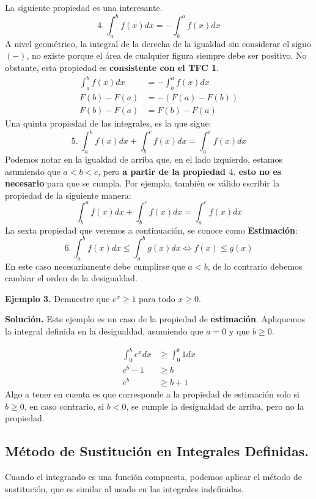 \documentclass[12pt]{article}
\begin{document}
La siguiente propiedad es una interesante.
\[
4. \, \int_{a}^{b} f(x)dx = - \int_{b}^{a} f(x)dx
\]
A nivel geométrico, la integral de la derecha de la igualdad sin considerar el signo $(-)$, no existe porque el área de cualquier figura siempre debe ser positivo. No obstante, esta propiedad es \textbf{consistente con el TFC 1}.
\begin{align*}
  \int_{a}^{b} f(x)dx &= - \int_{b}^{a} f(x)dx \\
  F(b) - F(a) &= - (F(a) - F(b)) \\
  F(b) - F(a) &= F(b) - F(a)
\end{align*}
Una quinta propiedad de las integrales, es la que sigue:
\[
5. \ \int_{a}^{b} f(x)dx + \int_{b}^{c} f(x)dx = \int_{a}^{c} f(x)dx
\]
Podemos notar en la igualdad de arriba que, en el lado izquierdo, estamos asumiendo que $a < b < c$, pero \textbf{a partir de la propiedad $4.$ esto no es necesario} para que se cumpla. Por ejemplo, también es válido escribir la propiedad de la siguiente manera:
\[
  \int_{b}^{a} f(x)dx + \int_{b}^{c} f(x)dx = \int_{a}^{c} f(x)dx
\]
La sexta propiedad que veremos a continuación, se conoce como \textbf{Estimación}:
\[
6. \, \int_{a}^{b} f(x)dx \leq \int_{a}^{b} g(x)dx \iff f(x) \leq g(x)
\]
En este caso necesariamente debe cumplirse que $a < b$, de lo contrario debemos cambiar el orden de la desigualdad.

\textbf{Ejemplo 3.} \quad Demuestre que $e^{x} \geq 1$ para todo $x \geq 0$.

\textbf{Solución.} \quad Este ejemplo es un caso de la propiedad de \textbf{estimación}. Apliquemos la integral definida en la desigualdad, asumiendo que $a = 0$ y que $b \geq 0$.

\begin{align*}
  \int_{0}^{b} e^{x}dx &\geq \int_{0}^{b} 1dx \\
  e^{b} - 1 &\geq b \\
  e^{b} &\geq b + 1
\end{align*}
Algo a tener en cuenta es que corresponde a la propiedad de estimación solo si $b \geq 0$, en caso contrario, si $b < 0$, se cumple la desigualdad de arriba, pero no la propiedad.

\subsection{Método de Sustitución en Integrales Definidas.}

Cuando el integrando es una función compuesta, podemos aplicar el método de sustitución, que es similar al usado en las integrales indefinidas.
\end{document}
